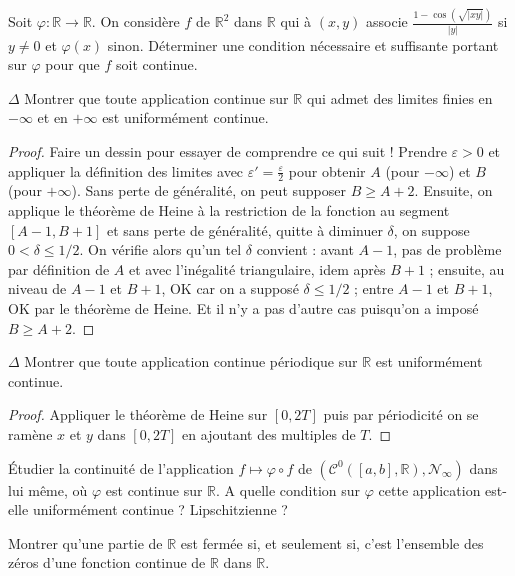 \documentclass[french,a4paper]{article}
\newcommand{\R}{\mathbb{R}}
\theoremstyle{plain}
\theoremstyle{definition}
\theoremstyle{remark}
\begin{document}
\begin{ex}[Moulin.17]{}
	Soit $\varphi:\R\to\R$. On considère $f$ de $\R^2$ dans $\R$ qui à $(x,y)$ associe $\displaystyle\frac{1-\cos(\sqrt{\lvert xy\rvert})}{\lvert y\rvert}$ si $y\ne 0$ et $\varphi(x)$ sinon. Déterminer une condition nécessaire et suffisante portant sur $\varphi$ pour que $f$ soit continue.
\end{ex}

\begin{ex}{$\Delta$}
	Montrer que toute application continue sur $\R$ qui admet des limites finies en $-\infty$ et en $+\infty$ est uniformément continue.
\end{ex}
\begin{proof}
	Faire un dessin pour essayer de comprendre ce qui suit ! Prendre $\varepsilon>0$ et appliquer la définition des limites avec $\varepsilon'=\displaystyle\frac{\varepsilon}{2}$ pour obtenir $A$ (pour $-\infty$) et $B$ (pour $+\infty$). Sans perte de généralité, on peut supposer $B\geqslant A+2$. Ensuite, on applique le théorème de Heine à la restriction de la fonction au segment $[A-1,B+1]$ et sans perte de généralité, quitte à diminuer $\delta$, on suppose $0<\delta\leqslant1/2$. On vérifie alors qu'un tel $\delta$ convient : avant $A-1$, pas de problème par définition de $A$ et avec l'inégalité triangulaire, idem après $B+1$ ; ensuite, au niveau de $A-1$ et $B+1$, OK car on a supposé $\delta\leqslant1/2$ ; entre $A-1$ et $B+1$, OK par le théorème de Heine. Et il n'y a pas d'autre cas puisqu'on a imposé $B\geqslant A+2$.
\end{proof}

\begin{ex}[Moulin.18]{$\Delta$}
	Montrer que toute application continue périodique sur $\R$ est uniformément continue.
\end{ex}
\begin{proof}
	Appliquer le théorème de Heine sur $[0,2T]$ puis par périodicité on se ramène $x$ et $y$ dans $[0,2T]$ en ajoutant des multiples de $T$.
\end{proof}

\begin{ex}[Moulin.19]{}
	Étudier la continuité de l'application $f\mapsto\varphi\circ f$ de $\left(\mathcal{C}^0([a,b],\R),\mathcal{N}_\infty\right)$ dans lui même, où $\varphi$ est continue sur $\R$. A quelle condition sur $\varphi$ cette application est-elle uniformément continue ? Lipschitzienne ?
\end{ex}

\begin{ex}[Moulin.20]{}
	Montrer qu'une partie de $\R$ est fermée si, et seulement si, c'est l'ensemble des zéros d'une fonction continue de $\R$ dans $\R$.
\end{ex}
\end{document}
